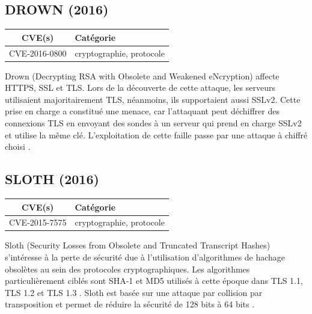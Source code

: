 

\subsection{DROWN (2016)}

\begin{tabularx}{0.96\textwidth}{|c|X|}
  \hline
  \textbf{CVE(s)} & \textbf{Catégorie} \\
  \hline
  CVE-2016-0800 & cryptographie, protocole \\
  \hline
\end{tabularx}

\vspace{1em}

Drown (Decrypting RSA with Obsolete and Weakened eNcryption) affecte HTTPS, SSL et TLS. Lors de la découverte de cette attaque, les serveurs utilisaient majoritairement TLS, néanmoins, ils supportaient aussi SSLv2. Cette prise en charge a constitué une menace, car l'attaquant peut déchiffrer des connexions TLS en envoyant des sondes à un serveur qui prend en charge SSLv2 et utilise la même clé. L'exploitation de cette faille passe par une attaque à chiffré choisi \cite{drown}.




\subsection{SLOTH (2016)}

\begin{tabularx}{0.96\textwidth}{|c|X|}
  \hline
  \textbf{CVE(s)} & \textbf{Catégorie} \\
  \hline
  CVE-2015-7575 & cryptographie, protocole \\
  \hline
\end{tabularx}

\vspace{1em}

Sloth (Security Losses from Obsolete and Truncated Transcript Hashes) s'intéresse à la perte de sécurité due à l'utilisation d'algorithmes de hachage obsolètes au sein des protocoles cryptographiques. Les algorithmes particulièrement ciblés sont SHA-1 et MD5 utilisés à cette époque dans TLS 1.1, TLS 1.2 et TLS 1.3 . Sloth est basée sur une attaque par collision par transposition et permet de réduire la sécurité de 128 bits à 64 bits \cite{sloth}.


